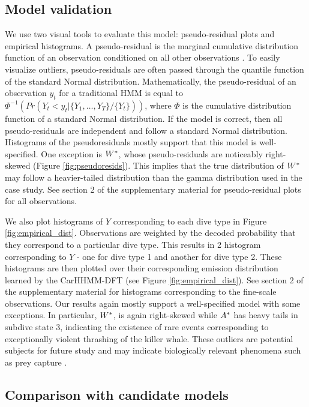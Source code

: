\subsection{Model validation}
\label{subsec:model_validation}

We use two visual tools to evaluate this model: pseudo-residual plots and empirical histograms. A pseudo-residual is the marginal cumulative distribution function of an observation conditioned on all other observations \citep{Zucchini:2016}. To easily visualize outliers, pseudo-residuals are often passed through the quantile function of the standard Normal distribution. Mathematically, the pseudo-residual of an observation $y_t$ for a traditional HMM is equal to $\Phi^{-1} \left(Pr(Y_t < y_t|\{Y_1,\ldots,Y_T\}/\{Y_t\}) \right)$, where $\Phi$ is the cumulative distribution function of a standard Normal distribution. If the model is correct, then all pseudo-residuals are independent and follow a standard Normal distribution. Histograms of the pseudoresiduals mostly support that this model is well-specified. One exception is $W^*$, whose pseudo-residuals are noticeably right-skewed (Figure \ref{fig:pseudoresids}). This implies that the true distribution of $W^*$ may follow a heavier-tailed distribution than the gamma distribution used in the case study. See section 2 of the supplementary material for pseudo-residual plots for all observations.

We also plot histograms of $Y$ corresponding to each dive type in Figure \ref{fig:empirical_dist}. Observations are weighted by the decoded probability that they correspond to a particular dive type. This results in 2 histogram corresponding to $Y$ - one for dive type 1 and another for dive type 2. These histograms are then plotted over their corresponding emission distribution learned by the CarHHMM-DFT (see Figure \ref{fig:empirical_dist}). See section 2 of the supplementary material for histograms corresponding to the fine-scale observations. Our results again mostly support a well-specified model with some exceptions. In particular, $W^*$, is again right-skewed while $A^*$ has heavy tails in subdive state 3, indicating the existence of rare events corresponding to exceptionally violent thrashing of the killer whale. These outliers are potential subjects for future study and may indicate biologically relevant phenomena such as prey capture \citep{Tennessen:2019a}.

\subsection{Comparison with candidate models}

